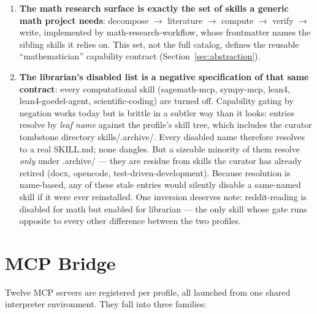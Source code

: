 \documentclass[10pt]{article}
\newcommand{\mono}[1]{{\ttfamily\small #1}}
\begin{document}
\begin{enumerate}
    \item \textbf{The math research surface is exactly the set of skills a generic math project
    needs}: decompose $\to$ literature $\to$ compute $\to$ verify $\to$ write, implemented by
    \mono{math-research-workflow}, whose frontmatter names the sibling skills it relies on. This
    set, not the full catalog, defines the reusable ``mathematician'' capability contract
    (Section~\ref{sec:abstraction}).
    \item \textbf{The librarian's disabled list is a negative specification of that same
    contract}: every computational skill (\mono{sagemath-mcp}, \mono{sympy-mcp},
    \mono{lean4}, \mono{lean4-goedel-agent}, \mono{scientific-coding}) are turned off. Capability gating by negation works today but is brittle in a
    subtler way than it looks: entries resolve by \emph{leaf name} against the profile's skill tree,
    which includes the curator tombstone directory \mono{skills/.archive/}. Every disabled name
    therefore resolves to a real \mono{SKILL.md}; none dangles. But a sizeable minority of them
    resolve \emph{only} under \mono{.archive/} --- they are residue from skills the curator has
    already retired (\mono{docx}, \mono{opencode}, \mono{test-driven-development}). Because resolution is name-based, any of these stale entries
    would silently disable a same-named skill if it were ever reinstalled. One inversion deserves note: \mono{reddit-reading} is
    disabled for math but enabled for librarian --- the only skill whose gate runs opposite to every
    other difference between the two profiles.
\end{enumerate}

\section{MCP Bridge}\label{sec:mcp}

Twelve MCP servers are registered per profile, all launched from one shared interpreter
environment. They fall into three families:
\end{document}
